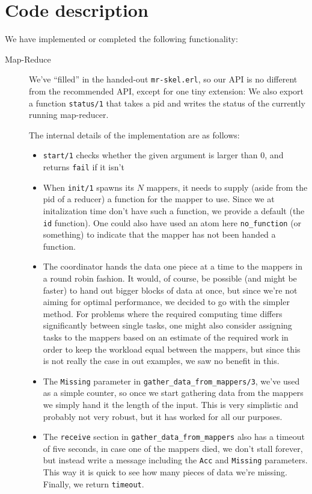 \documentclass[a4paper]{article}
\begin{document}
\section*{Code description}
We have implemented or completed the following functionality:
\begin{description}
\item[Map-Reduce] We've ``filled'' in the handed-out \texttt{mr-skel.erl}, so our API is no different from the recommended API, except for one tiny extension: We also export a function \texttt{status/1} that takes a pid and writes the status of the currently running map-reducer.
  
  The internal details of the implementation are as follows:
  \begin{itemize}
  \item \texttt{start/1} checks whether the given argument is larger than $0$, and returns \texttt{fail} if it isn't
  \item When \texttt{init/1} spawns its $N$ mappers, it needs to supply (aside from the pid of a reducer) a function for the mapper to use. Since we at initalization time don't have such a function, we provide a default (the \texttt{id} function). One could also have used an atom here \texttt{no\_function} (or something) to indicate that the mapper has not been handed a function.
  \item The coordinator hands the data one piece at a time to the mappers in a round robin fashion. It would, of course, be possible (and might be faster) to hand out bigger blocks of data at once, but since we're not aiming for optimal performance, we decided to go with the simpler method. For problems where the required computing time differs significantly between single tasks, one might also consider assigning tasks to the mappers based on an estimate of the required work in order to keep the workload equal between the mappers, but since this is not really the case in out examples, we saw no benefit in this.
  \item The \texttt{Missing} parameter in \texttt{gather\_data\_from\_mappers/3}, we've used as a simple counter, so once we start gathering data from the mappers we simply hand it the length of the input. This is very simplistic and probably not very robust, but it has worked for all our purposes.
  \item The \texttt{receive} section in \texttt{gather\_data\_from\_mappers} also has a timeout of five seconds, in case one of the mappers died, we don't stall forever, but instead write a message including the \texttt{Acc} and \texttt{Missing} parameters. This way it is quick to see how many pieces of data we're missing. Finally, we return \texttt{timeout}.

\end{itemize}
\end{description}
\end{document}

